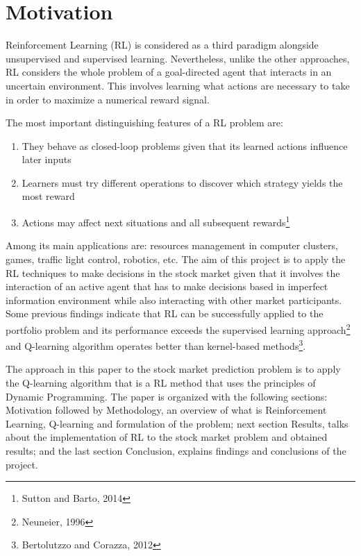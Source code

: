 \documentclass[12pt]{article}
\title{}
\author{}
\begin{document}
\maketitle

\section{Motivation}
Reinforcement Learning (RL) is considered as a third paradigm alongside unsupervised and supervised learning. Nevertheless, unlike the other approaches, RL considers the whole problem of a goal-directed agent that interacts in an uncertain environment. This involves learning what actions are necessary to take in order to maximize a numerical reward signal. 

The most important distinguishing features of a RL problem are:
\begin{enumerate}
	\item They behave as closed-loop problems given that its learned actions influence later inputs
	\item Learners must try different operations to discover which strategy yields the most reward
	\item Actions may affect next situations and all subsequent rewards\footnote{Sutton and Barto, 2014}
\end{enumerate}

Among its main applications are: resources management in computer clusters, games, traffic light control, robotics, etc. The aim of this project is to apply the RL techniques to make decisions in the stock market given that it involves the interaction of an active agent that has to make decisions based in imperfect information environment while also interacting with other market participants. Some previous findings indicate that RL can be successfully applied to the portfolio problem and its performance exceeds the supervised learning approach\footnote{Neuneier, 1996} and Q-learning algorithm operates better than kernel-based methods\footnote{Bertolutzzo and Corazza, 2012}.

The approach in this paper to the stock market prediction problem is to apply the Q-learning algorithm that is a RL method that uses the principles of Dynamic Programming. The paper is organized with the following sections: Motivation followed by Methodology, an overview of what is Reinforcement Learning, Q-learning and formulation of the problem; next section Results, talks about the implementation of RL to the stock market problem and obtained results; and the last section Conclusion, explains findings and conclusions of the project.  
\end{document}
